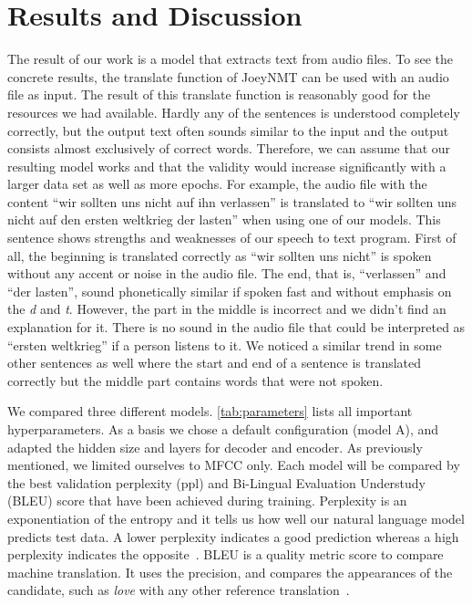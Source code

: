 \documentclass[11pt,a4paper]{article}
\begin{document}
\section{Results and Discussion}
The result of our work is a model that extracts text from audio files. 
To see the concrete results, the translate function of JoeyNMT can be used with an audio file as input.
The result of this translate function is reasonably good for the resources we had available.
Hardly any of the sentences is understood completely correctly, but the output text often sounds similar to the input and the output consists almost exclusively of correct words.
Therefore, we can assume that our resulting model works and that the validity would increase significantly with a larger data set as well as more epochs.
For example, the audio file with the content \enquote{wir sollten uns nicht auf ihn verlassen} is translated to \enquote{wir sollten uns nicht auf den ersten weltkrieg der lasten} when using one of our models.
This sentence shows strengths and weaknesses of our speech to text program.
First of all, the beginning is translated correctly as \enquote{wir sollten uns nicht} is spoken without any accent or noise in the audio file.
The end, that is, \enquote{verlassen} and \enquote{der lasten}, sound phonetically similar if spoken fast and without emphasis on the \textit{d} and \textit{t}.
However, the part in the middle is incorrect and we didn't find an explanation for it.
There is no sound in the audio file that could be interpreted as \enquote{ersten weltkrieg} if a person listens to it.
We noticed a similar trend in some other sentences as well where
the start and end of a sentence is translated correctly but the middle part contains words that were not spoken.

We compared three different models.
\autoref{tab:parameters} lists all important hyperparameters.
As a basis we chose a default configuration (model A), and adapted the hidden size and layers for decoder and encoder.
As previously mentioned, we limited ourselves to MFCC only.
Each model will be compared by the best validation perplexity (ppl) and Bi-Lingual Evaluation Understudy (BLEU) score that have been achieved during training.
Perplexity is an exponentiation of the entropy and it tells us how well our natural language model predicts test data.
A lower perplexity indicates a good prediction whereas a high perplexity indicates the opposite~\cite{jozefowicz2016exploring}.
BLEU is a quality metric score to compare machine translation.
It uses the precision, and compares the appearances of the candidate, such as \textit{love} with any other reference translation~\cite{Papineni2002}.
\end{document}
